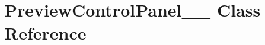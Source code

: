 \hypertarget{classGUI_1_1PreviewControlPanel____8}{}\section{Preview\+Control\+Panel\+\_\+\+\_ Class Reference}
\label{classGUI_1_1PreviewControlPanel____8}

